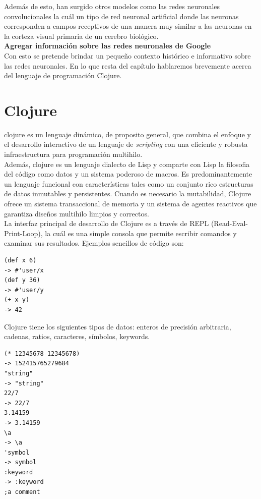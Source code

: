 Además de esto, han surgido otros modelos como las redes neuronales
convolucionales \cite{hubel1968receptive, fukushima1980neocognitron,
  behnke2003hierarchical, lecun1998gradient, graupe1988applications}
la cuál un tipo de red neuronal artificial donde las neuronas
corresponden a campos receptivos de una manera muy similar a las
neuronas en la corteza visual primaria de un cerebro biológico.\\

\textbf{Agregar información sobre las redes neuronales de Google}\\

Con esto se pretende brindar un pequeño contexto histórico e
informativo sobre las redes neuronales. En lo que resta del capítulo
hablaremos brevemente acerca del lenguaje de programación Clojure.

\section{Clojure}

\gls{clojure} es un lenguaje dinámico, de proposito general, que combina el
enfoque y el desarrollo interactivo de un lenguaje de
\textsl{scripting} con una eficiente y robusta infraestructura para
programación multihilo.\\

Además, \gls{clojure} es un lenguaje dialecto de Lisp y comparte con
Lisp la filosofia del código como datos y un sistema poderoso de
macros. Es predominantemente un lenguaje funcional con características
tales como un conjunto rico estructuras de datos inmutables y
persistentes. Cuando es necesario la mutabilidad, Clojure ofrece un
sistema transaccional de memoria y un sistema de agentes reactivos que
garantiza diseños multihilo limpios y correctos.\\

La interfaz principal de desarrollo de Clojure es a través de REPL
(Read-Eval-Print-Loop), la cuál es una simple consola que permite
escribir comandos y examinar sus resultados. Ejemplos sencillos de
código son:

\begin{verbatim}
(def x 6)
-> #'user/x
(def y 36)
-> #'user/y
(+ x y)
-> 42
\end{verbatim}

Clojure tiene los siguientes tipos de datos: enteros de precisión
arbitraria, cadenas, ratios, caracteres, símbolos, keywords.

\begin{verbatim}
(* 12345678 12345678)
-> 152415765279684
"string"
-> "string"
22/7
-> 22/7
3.14159
-> 3.14159
\a
-> \a
'symbol
-> symbol
:keyword
-> :keyword
;a comment
\end{verbatim}

